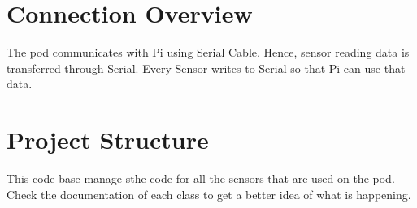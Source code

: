\hypertarget{index_connection_sec}{}\section{Connection Overview}\label{index_connection_sec}
The pod communicates with Pi using Serial Cable. Hence, sensor reading data is transferred through Serial. Every Sensor writes to Serial so that Pi can use that data.\hypertarget{index_project_sec}{}\section{Project Structure}\label{index_project_sec}
This code base manage sthe code for all the sensors that are used on the pod. Check the documentation of each class to get a better idea of what is happening. 